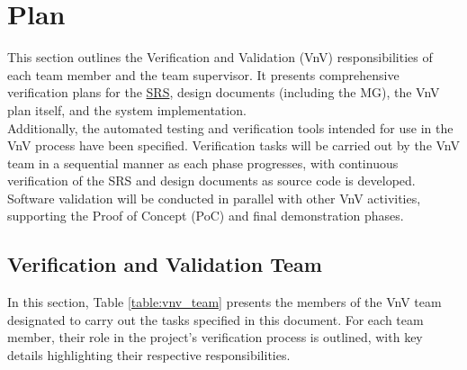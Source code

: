 \documentclass[12pt, titlepage]{article}
\begin{document}
\section{Plan}
This section outlines the Verification and Validation (VnV) responsibilities of
each team member and the team supervisor. It presents comprehensive verification
plans for the
\href{https://github.com/SumanyaG/Alkalytics/blob/f856af96669275cc29428a8f2cd4b863e4523ff6/docs/SRS/SRS.pdf}{SRS},
design documents (including the MG), the VnV plan itself, and the system
implementation.\\
\newline Additionally, the automated testing and verification tools intended for
use in the VnV process have been specified. Verification tasks will be carried
out by the VnV team in a sequential manner as each phase progresses, with
continuous verification of the SRS and design documents as source code is
developed. Software validation will be conducted in parallel with other VnV
activities, supporting the Proof of Concept (PoC) and final demonstration
phases.

\subsection{Verification and Validation Team}\label{section:vnv_team} In this
section, Table \ref{table:vnv_team} presents the members of the VnV team
designated to carry out the tasks specified in this document. For each team
member, their role in the project's verification process is outlined, with key
details highlighting their respective responsibilities.
\end{document}
